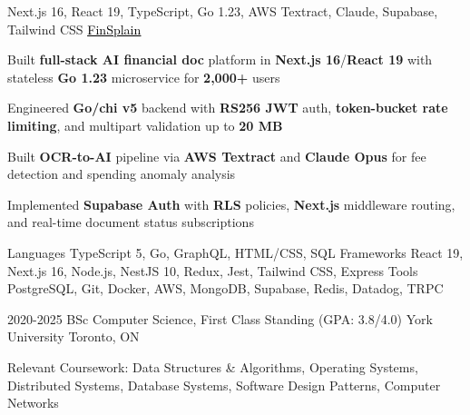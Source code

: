 \documentclass[11pt, a4paper]{awesome-cv}
\begin{document}
\begin{cventries}
\end{cventries}


\begin{cventries}

  \cventry
  {Next.js 16, React 19, TypeScript, Go 1.23, AWS Textract, Claude, Supabase, Tailwind CSS}
  {\href{https://finsplain.net}{\textcolor{black}{\underline{FinSplain}} \faExternalLink}}
  {}
  {}
  {
    \begin{cvitems}
      \item {Built \textbf{full-stack AI financial doc} platform in \textbf{Next.js 16}/\textbf{React 19} with stateless \textbf{Go 1.23} microservice for \textbf{2,000+} users}
      \item {Engineered \textbf{Go/chi v5} backend with \textbf{RS256 JWT} auth, \textbf{token-bucket rate limiting}, and multipart validation up to \textbf{20 MB}}
      \item {Built \textbf{OCR-to-AI} pipeline via \textbf{AWS Textract} and \textbf{Claude Opus} for fee detection and spending anomaly analysis}
      \item {Implemented \textbf{Supabase Auth} with \textbf{RLS} policies, \textbf{Next.js} middleware routing, and real-time document status subscriptions}
    \end{cvitems}
  }

\end{cventries}


\begin{cvskills}
  \cvskill
  {Languages}
  {TypeScript 5, Go, GraphQL, HTML/CSS, SQL}
  \cvskill
  {Frameworks}
  {React 19, Next.js 16, Node.js, NestJS 10, Redux, Jest, Tailwind CSS, Express}
  \cvskill
  {Tools}
  {PostgreSQL, Git, Docker, AWS, MongoDB, Supabase, Redis, Datadog, TRPC}
\end{cvskills}

\vspace{-2mm}

\begin{cventries}
  \cventry
  {2020-2025}
  {BSc Computer Science, First Class Standing (GPA: 3.8/4.0)}
  {York University}
  {Toronto, ON}
  {%
    \begin{cvitems}
      \item {Relevant Coursework: Data Structures \& Algorithms, Operating Systems, Distributed Systems, Database Systems, Software Design Patterns, Computer Networks}
    \end{cvitems}
  }
\end{cventries}

\end{document}
